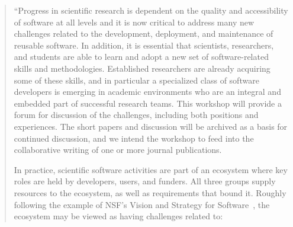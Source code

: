 \documentclass[11pt, oneside]{amsart}
\begin{document}
\begin{quote}
``Progress in scientific research is dependent on the quality and
accessibility of software at all levels and it is now critical to
address many new challenges related to the development, deployment,
and maintenance of reusable software. In addition, it is essential
that scientists, researchers, and students are able to learn and adopt
a new set of software-related skills and methodologies. Established
researchers are already acquiring some of these skills, and in
particular a specialized class of software developers is emerging in
academic environments who are an integral and embedded part of
successful research teams. This workshop will provide a forum for
discussion of the challenges, including both positions and
experiences. The short papers and discussion will be archived as a
basis for continued discussion, and we intend the workshop to feed
into the collaborative writing of one or more journal publications.

In practice, scientific software activities are part of an ecosystem
where key roles are held by developers, users, and funders. All three
groups supply resources to the ecosystem, as well as requirements that
bound it. Roughly following the example of NSF's Vision and Strategy
for Software~\cite{NSF_software_vision},
the ecosystem may be viewed as having challenges related to:


\end{quote}
\end{document}
